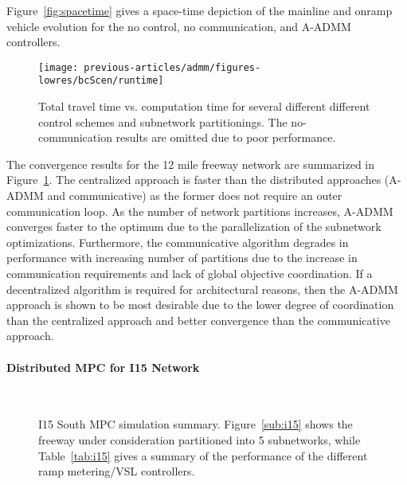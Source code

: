 Figure~\ref{fig:spacetime} gives a space-time depiction of the mainline and onramp vehicle evolution for the no control, no communication, and A-ADMM controllers.

\begin{figure}[t]
  \centering
  \texttt{[image: previous-articles/admm/figures-lowres/bcScen/runtime]}
  \caption{Total travel time vs. computation time for several different different control schemes and subnetwork partitionings. The no-communication results are omitted due to poor performance.}
  \label{fig:runtime}
\end{figure}

The convergence results for the 12 mile freeway network are summarized in Figure~\ref{fig:runtime}. The centralized approach is faster than the distributed approaches (A-ADMM and communicative) as the former does not require an outer communication loop. As the number of network partitions increases, A-ADMM converges faster to the optimum due to the parallelization of the subnetwork optimizations. Furthermore, the communicative algorithm degrades in performance with increasing number of partitions due to the increase in communication requirements and lack of global objective coordination. If a decentralized algorithm is required for architectural reasons, then the A-ADMM approach is shown to be most desirable due to the lower degree of coordination than the centralized approach and better convergence than the communicative approach.

\paragraph{Distributed MPC for I15 Network}

\begin{figure}[ht]
  \centering
   \\
    \caption{I15 South MPC simulation summary. Figure~\ref{sub:i15} shows the freeway under consideration partitioned into 5 subnetworks, while Table~\ref{tab:i15} gives a summary of the performance of the different ramp metering/VSL controllers.}
    \label{fig:i15-admm}
\end{figure}


